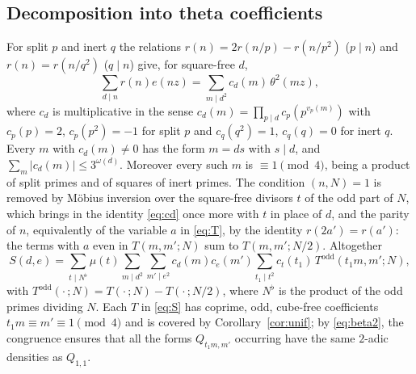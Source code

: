 \documentclass[11pt]{amsart}
\theoremstyle{remark}
\begin{document}
\subsection{Decomposition into theta coefficients}
For split $p$ and inert $q$ the relations $r(n)=2r(n/p)-r(n/p^2)$ ($p\mid n$) and $r(n)=r(n/q^2)$ ($q\mid n$) give, for square-free $d$,
\begin{equation}\label{eq:cd}
\sum_{d\mid n}r(n)e(nz)=\sum_{m\mid d^2}c_d(m)\,\theta^2(mz),
\end{equation}
where $c_d$ is multiplicative in the sense $c_d(m)=\prod_{p\mid d}c_p(p^{v_p(m)})$ with $c_p(p)=2$, $c_p(p^2)=-1$ for split $p$ and $c_q(q^2)=1$, $c_q(q)=0$ for inert $q$. Every $m$ with $c_d(m)\ne0$ has the form $m=ds$ with $s\mid d$, and $\sum_m|c_d(m)|\le3^{\omega(d)}$. Moreover every such $m$ is $\equiv1\pmod4$, being a product of split primes and of squares of inert primes. The condition $(n,N)=1$ is removed by M\"obius inversion over the square-free divisors $t$ of the odd part of $N$, which brings in the identity \eqref{eq:cd} once more with $t$ in place of $d$, and the parity of $n$, equivalently of the variable $a$ in \eqref{eq:T}, by the identity $r(2a')=r(a')$: the terms with $a$ even in $T(m,m';N)$ sum to $T(m,m';N/2)$. Altogether
\begin{equation}\label{eq:S}
S(d,e)=\sum_{t\mid N^\flat}\mu(t)\sum_{m\mid d^2}\sum_{m'\mid e^2}c_d(m)c_e(m')\sum_{t_1\mid t^2}c_t(t_1)\,T^{\mathrm{odd}}(t_1m,m';N),
\end{equation}
with $T^{\mathrm{odd}}(\cdot\,;N)=T(\cdot\,;N)-T(\cdot\,;N/2)$,
where $N^\flat$ is the product of the odd primes dividing $N$. Each $T$ in \eqref{eq:S} has coprime, odd, cube-free coefficients $t_1m\equiv m'\equiv1\pmod4$ and is covered by Corollary~\ref{cor:unif}; by \eqref{eq:beta2}, the congruence ensures that all the forms $Q_{t_1m,m'}$ occurring have the same $2$-adic densities as $Q_{1,1}$.
\end{document}
